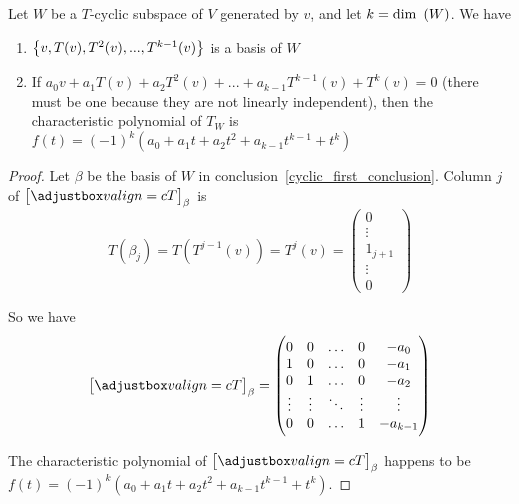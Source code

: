 \begin{theorem}\label{char_poly_of_invariant_subspace}
    Let $W$ be a $T$-cyclic subspace of $V$ generated by $v$, and let $k = \displaystyle \mathrm{dim}~\left( W \right)$. We have
    \begin{enumerate}
        \item $\set{v, T(v), T^2(v), ..., T^{k-1}(v)}$ is a basis of $W$\label{cyclic_first_conclusion}
        \item If $a_0 v + a_1 T(v) + a_2 T^2(v) + ... + a_{k-1} T^{k-1} (v) + T^k (v) = 0$ (there must be one because they are not linearly independent), then the characteristic polynomial of $T_W$ is $f(t) = (-1)^k (a_0 + a_1 t + a_2 t^2 + a_{k-1} t^{k-1} + t^k)$
    \end{enumerate}
\end{theorem}
\begin{proof}
    Let $\beta$ be the basis of $W$ in conclusion~\ref{cyclic_first_conclusion}. Column $j$ of $\coordinate{T}_\beta$ is 
    \begin{equation*}
        T(\beta_j) = T\left(T^{j-1}(v)\right) = T^{j}(v) = \begin{pmatrix}
            0 \\
            \vdots \\
            1_{j+1} \\
            \vdots \\
            0
        \end{pmatrix}
    \end{equation*}
    
    So we have 
    \begin{equation*}
        \coordinate{T}_\beta = \begin{pmatrix}
            0 & 0 & \hdots & 0 & -a_0 \\
            1 & 0 & \hdots & 0 & -a_1 \\
            0 & 1 & \hdots & 0 & -a_2 \\
            \vdots & \vdots & \ddots & \vdots & \vdots \\
            0 & 0 & \hdots & 1 & -a_{k-1}
        \end{pmatrix}
    \end{equation*}
    
    The characteristic polynomial of $\coordinate{T}_\beta$ happens to be $f(t) = (-1)^k (a_0 + a_1 t + a_2 t^2 + a_{k-1} t^{k-1} + t^k)$.
\end{proof}

